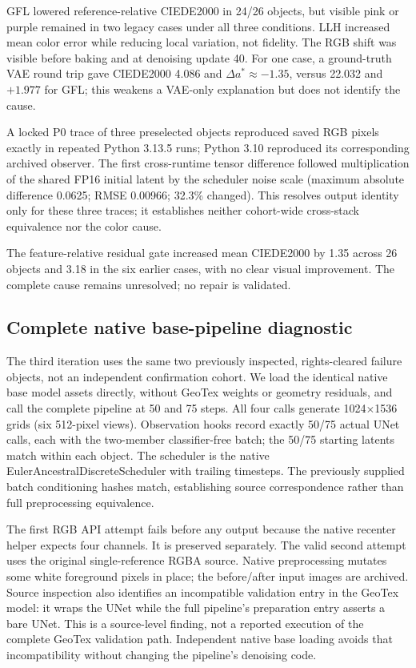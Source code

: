 \documentclass[11pt]{article}
\begin{document}
GFL lowered reference-relative CIEDE2000 in 24/26 objects, but visible pink or purple remained in two legacy cases under all three conditions. LLH increased mean color error while reducing local variation, not fidelity. The RGB shift was visible before baking and at denoising update 40. For one case, a ground-truth VAE round trip gave CIEDE2000 4.086 and $\Delta a^*\approx-1.35$, versus 22.032 and $+1.977$ for GFL; this weakens a VAE-only explanation but does not identify the cause.

A locked P0 trace of three preselected objects reproduced saved RGB pixels exactly in repeated Python 3.13.5 runs; Python 3.10 reproduced its corresponding archived observer. The first cross-runtime tensor difference followed multiplication of the shared FP16 initial latent by the scheduler noise scale (maximum absolute difference 0.0625; RMSE 0.00966; 32.3\% changed). This resolves output identity only for these three traces; it establishes neither cohort-wide cross-stack equivalence nor the color cause.

The feature-relative residual gate increased mean CIEDE2000 by 1.35 across 26 objects and 3.18 in the six earlier cases, with no clear visual improvement. The complete cause remains unresolved; no repair is validated.

\subsection*{Complete native base-pipeline diagnostic}
The third iteration uses the same two previously inspected, rights-cleared failure objects, not an independent confirmation cohort. We load the identical native base model assets directly, without GeoTex weights or geometry residuals, and call the complete pipeline at 50 and 75 steps. All four calls generate 1024$\times$1536 grids (six 512-pixel views). Observation hooks record exactly 50/75 actual UNet calls, each with the two-member classifier-free batch; the 50/75 starting latents match within each object. The scheduler is the native EulerAncestralDiscreteScheduler with trailing timesteps. The previously supplied batch conditioning hashes match, establishing source correspondence rather than full preprocessing equivalence.

The first RGB API attempt fails before any output because the native recenter helper expects four channels. It is preserved separately. The valid second attempt uses the original single-reference RGBA source. Native preprocessing mutates some white foreground pixels in place; the before/after input images are archived. Source inspection also identifies an incompatible validation entry in the GeoTex model: it wraps the UNet while the full pipeline's preparation entry asserts a bare UNet. This is a source-level finding, not a reported execution of the complete GeoTex validation path. Independent native base loading avoids that incompatibility without changing the pipeline's denoising code.
\end{document}
